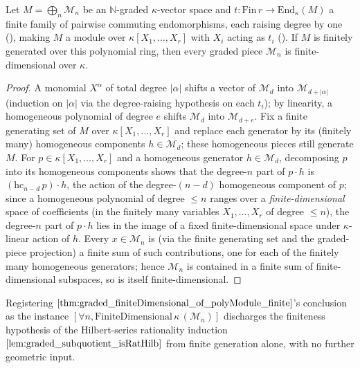 \begin{theorem}
  \label{thm:graded_finiteDimensional_of_polyModule_finite}
  \leanok
  Let \(M = \bigoplus_n \mathcal{M}_n\) be an \(\mathbb{N}\)-graded
  \(\kappa\)-vector space and \(t \colon \mathrm{Fin}\,r \to
  \mathrm{End}_\kappa(M)\) a finite family of pairwise commuting
  endomorphisms, each raising degree by one
  (), making \(M\) a module over
  \(\kappa[X_1, \dots, X_r]\) with \(X_i\) acting as \(t_i\)
  (). If \(M\) is finitely generated over
  this polynomial ring, then every graded piece \(\mathcal{M}_n\) is
  finite-dimensional over \(\kappa\).
\end{theorem}
\begin{proof}
  \leanok
  A monomial \(X^\alpha\) of total degree \(|\alpha|\) shifts a vector
  of \(\mathcal{M}_d\) into \(\mathcal{M}_{d+|\alpha|}\) (induction on
  \(|\alpha|\) via the degree-raising hypothesis on each \(t_i\)); by
  linearity, a homogeneous polynomial of degree \(e\) shifts
  \(\mathcal{M}_d\) into \(\mathcal{M}_{d+e}\). Fix a finite generating
  set of \(M\) over \(\kappa[X_1,\dots,X_r]\) and replace each generator
  by its (finitely many) homogeneous components \(h \in \mathcal{M}_{d}\);
  these homogeneous pieces still generate \(M\). For \(p \in
  \kappa[X_1,\dots,X_r]\) and a homogeneous generator \(h \in
  \mathcal{M}_d\), decomposing \(p\) into its homogeneous components
  shows that the degree-\(n\) part of \(p \cdot h\) is
  \((\mathrm{hc}_{n-d}\,p) \cdot h\), the action of the degree-\((n-d)\)
  homogeneous component of \(p\); since a homogeneous polynomial of
  degree \(\le n\) ranges over a \emph{finite-dimensional} space of
  coefficients (in the finitely many variables \(X_1,\dots,X_r\) of
  degree \(\le n\)), the degree-\(n\) part of \(p \cdot h\) lies in the
  image of a fixed finite-dimensional space under \(\kappa\)-linear
  action of \(h\). Every \(x \in \mathcal{M}_n\) is (via the finite
  generating set and the graded-piece projection) a finite sum of such
  contributions, one for each of the finitely many homogeneous
  generators; hence \(\mathcal{M}_n\) is contained in a finite sum of
  finite-dimensional subspaces, so is itself finite-dimensional.
\end{proof}

\begin{remark}
  \label{rem:graded_pieces_finite_consumer}
  Registering \(\Cref{thm:graded_finiteDimensional_of_polyModule_finite}\)'s
  conclusion as the instance \([\forall n,
  \mathrm{FiniteDimensional}\,\kappa\,(\mathcal{M}_n)]\) discharges the
  finiteness hypothesis of the Hilbert-series rationality induction
  \(\Cref{lem:graded_subquotient_isRatHilb}\) from finite generation
  alone, with no further geometric input.
\end{remark}
